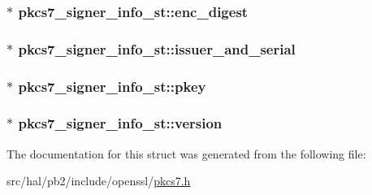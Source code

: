 \subsubsection[{\texorpdfstring{enc\+\_\+digest}{enc_digest}}]{$\ast$ pkcs7\+\_\+signer\+\_\+info\+\_\+st\+::enc\+\_\+digest}\hypertarget{structpkcs7__signer__info__st_a75a871ba0bdc83cbd05822e844badf40}{}\label{structpkcs7__signer__info__st_a75a871ba0bdc83cbd05822e844badf40}
\subsubsection[{\texorpdfstring{issuer\+\_\+and\+\_\+serial}{issuer_and_serial}}]{$\ast$ pkcs7\+\_\+signer\+\_\+info\+\_\+st\+::issuer\+\_\+and\+\_\+serial}\hypertarget{structpkcs7__signer__info__st_aa50f5aaf37775fa181c551407b620d6c}{}\label{structpkcs7__signer__info__st_aa50f5aaf37775fa181c551407b620d6c}
\subsubsection[{\texorpdfstring{pkey}{pkey}}]{$\ast$ pkcs7\+\_\+signer\+\_\+info\+\_\+st\+::pkey}\hypertarget{structpkcs7__signer__info__st_acac9c5af6fa0f01bb42fe39c8f2f646a}{}\label{structpkcs7__signer__info__st_acac9c5af6fa0f01bb42fe39c8f2f646a}
\subsubsection[{\texorpdfstring{version}{version}}]{$\ast$ pkcs7\+\_\+signer\+\_\+info\+\_\+st\+::version}\hypertarget{structpkcs7__signer__info__st_ab6bd5b6bebe8adab9a294916c929bdc0}{}\label{structpkcs7__signer__info__st_ab6bd5b6bebe8adab9a294916c929bdc0}


The documentation for this struct was generated from the following file\+:\begin{DoxyCompactItemize}
\item 
src/hal/pb2/include/openssl/\hyperlink{pkcs7_8h}{pkcs7.\+h}\end{DoxyCompactItemize}
